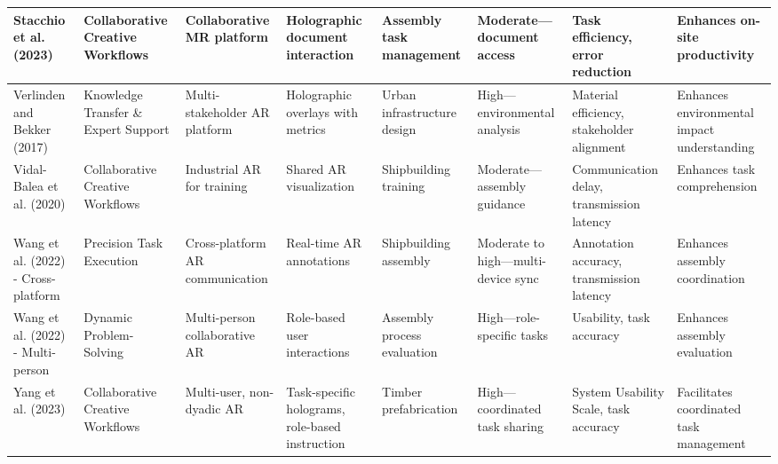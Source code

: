 {\begin{landscape}
\begin{longtable}{@{}p{1.8cm}p{1.8cm}p{1.8cm}p{1.8cm}p{1.8cm}p{1.8cm}p{1.8cm}p{1.8cm}@{}}
\midrule
Stacchio et al. (2023) & Collaborative Creative Workflows & Collaborative MR platform & Holographic document interaction & Assembly task management & Moderate—document access & Task efficiency, error reduction & Enhances on-site productivity \\
\midrule
Verlinden and Bekker (2017) & Knowledge Transfer \& Expert Support & Multi-stakeholder AR platform & Holographic overlays with metrics & Urban infrastructure design & High—environmental analysis & Material efficiency, stakeholder alignment & Enhances environmental impact understanding \\
\midrule
Vidal-Balea et al. (2020) & Collaborative Creative Workflows & Industrial AR for training & Shared AR visualization & Shipbuilding training & Moderate—assembly guidance & Communication delay, transmission latency & Enhances task comprehension \\
\midrule
Wang et al. (2022) - Cross-platform & Precision Task Execution & Cross-platform AR communication & Real-time AR annotations & Shipbuilding assembly & Moderate to high—multi-device sync & Annotation accuracy, transmission latency & Enhances assembly coordination \\
\midrule
Wang et al. (2022) - Multi-person & Dynamic Problem-Solving & Multi-person collaborative AR & Role-based user interactions & Assembly process evaluation & High—role-specific tasks & Usability, task accuracy & Enhances assembly evaluation \\

Yang et al. (2023) & Collaborative Creative Workflows & Multi-user, non-dyadic AR & Task-specific holograms, role-based instruction & Timber prefabrication & High—coordinated task sharing & System Usability Scale, task accuracy & Facilitates coordinated task management \\
\end{longtable}
\end{landscape}
\clearpage
} 